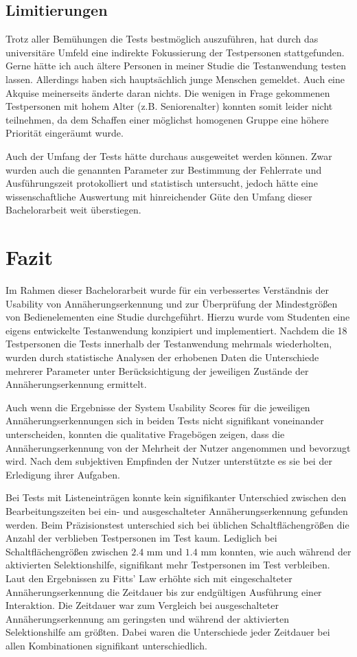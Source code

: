 \documentclass[12pt,numbers=noenddot,parskip,bibliography=totocnumbered,listof=totocnumbered]{scrreprt}
\begin{document}
\section{Limitierungen}
Trotz aller Bemühungen die Tests bestmöglich auszuführen, hat durch das universitäre Umfeld eine indirekte Fokussierung der Testpersonen stattgefunden. Gerne hätte ich auch ältere Personen in meiner Studie die Testanwendung testen lassen. Allerdings haben sich hauptsächlich junge Menschen gemeldet. Auch eine Akquise meinerseits änderte daran nichts. Die wenigen in Frage gekommenen Testpersonen mit hohem Alter (z.B. Seniorenalter) konnten somit leider nicht teilnehmen, da dem Schaffen einer möglichst homogenen Gruppe eine höhere Priorität eingeräumt wurde.

Auch der Umfang der Tests hätte durchaus ausgeweitet werden können. Zwar wurden auch die genannten Parameter zur Bestimmung der Fehlerrate und Ausführungszeit protokolliert und statistisch untersucht, jedoch hätte eine wissenschaftliche Auswertung mit hinreichender Güte den Umfang dieser Bachelorarbeit weit überstiegen.

\chapter{Fazit}
Im Rahmen dieser Bachelorarbeit wurde für ein verbessertes Verständnis der Usability von Annäherungserkennung und zur Überprüfung der Mindestgrößen von Bedienelementen eine Studie durchgeführt. Hierzu wurde vom Studenten eine eigens entwickelte Testanwendung konzipiert und implementiert. Nachdem die 18 Testpersonen die Tests innerhalb der Testanwendung mehrmals wiederholten, wurden durch statistische Analysen der erhobenen Daten die Unterschiede mehrerer Parameter unter Berücksichtigung der jeweiligen Zustände der Annäherungserkennung ermittelt.

Auch wenn die Ergebnisse der System Usability Scores für die jeweiligen Annäherungserkennungen sich in beiden Tests nicht signifikant voneinander unterscheiden, konnten die qualitative Fragebögen zeigen, dass die Annäherungserkennung von der Mehrheit der Nutzer angenommen und bevorzugt wird. Nach dem subjektiven Empfinden der Nutzer unterstützte es sie bei der Erledigung ihrer Aufgaben.

Bei Tests mit Listeneinträgen konnte kein signifikanter Unterschied zwischen den Bearbeitungszeiten bei ein- und ausgeschalteter Annäherungserkennung gefunden werden. Beim Präzisionstest unterschied sich bei üblichen Schaltflächengrößen die Anzahl der verblieben Testpersonen im Test kaum. Lediglich bei Schaltflächengrößen zwischen $2.4$ mm und $1.4$ mm konnten, wie auch während der aktivierten Selektionshilfe, signifikant mehr Testpersonen im Test verbleiben. Laut den Ergebnissen zu Fitts' Law erhöhte sich mit eingeschalteter Annäherungserkennung die Zeitdauer bis zur endgültigen Ausführung einer Interaktion. Die Zeitdauer war zum Vergleich bei ausgeschalteter Annäherungserkennung am geringsten und während der aktivierten Selektionshilfe am größten. Dabei waren die Unterschiede jeder Zeitdauer bei allen Kombinationen signifikant unterschiedlich.
\end{document}
